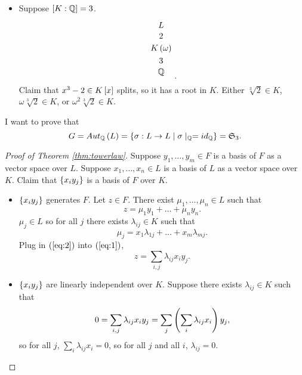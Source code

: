 \begin{example1}
\begin{itemize}
$$$$
Either $ \omega \in K $, that is $ \Q\rb{\omega} \subset K $, so by Theorem \ref{thm:towerlaw} $ \Q\rb{\omega} = K $. Or $ \omega \notin K $ gives $ \sb{K\rb{\omega} : K} = 2 $, so $ \sb{K\rb{\omega} : \Q} = 4 $ contradicts the tower law for $ \Q \subset K\rb{\omega} \subset L $.
\item Suppose $ \sb{K : \Q} = 3 $.
$$
\begin{tikzpicture}
\node (L) at (0, 1) {$ L $};
\node (K) at (0, 0) {$ K\rb{\omega} $};
\node (Q) at (0, -1) {$ \Q $};
\draw (L) -- node[fill=white]{2} (K) -- node[fill=white]{3} (Q);
\end{tikzpicture}.
$$
Claim that $ x^3 - 2 \in K\sb{x} $ splits, so it has a root in $ K $. Either $ \sqrt[3]{2} \in K $, $ \omega\sqrt[3]{2} \in K $, or $ \omega^2\sqrt[3]{2} \in K $.
\end{itemize}
I want to prove that
$$ G = Aut_\Q\rb{L} = \cb{\sigma : L \to L \mid \sigma \mid_\Q = id_\Q} = \mathfrak{S}_3. $$
\end{example1}


\begin{proof}[Proof of Theorem \ref{thm:towerlaw}]
Suppose $ y_1, \dots, y_m \in F $ is a basis of $ F $ as a vector space over $ L $. Suppose $ x_1, \dots, x_n \in L $ is a basis of $ L $ as a vector space over $ K $. Claim that $ \cb{x_iy_j} $ is a basis of $ F $ over $ K $.
\begin{itemize}
\item $ \cb{x_iy_j} $ generates $ F $. Let $ z \in F $. There exist $ \mu_1, \dots, \mu_n \in L $ such that
\begin{equation}
\label{eq:1}
z = \mu_1y_1 + \dots + \mu_ny_n.
\end{equation}
$ \mu_j \in L $ so for all $ j $ there exists $ \lambda_{ij} \in K $ such that
\begin{equation}
\label{eq:2}
\mu_j = x_1\lambda_{1j} + \dots + x_m\lambda_{mj}.
\end{equation}
Plug in $ \rb{\ref{eq:2}} $ into $ \rb{\ref{eq:1}} $,
$$ z = \sum_{i, j} \lambda_{ij}x_iy_j. $$
\item $ \cb{x_iy_j} $ are linearly independent over $ K $. Suppose there exists $ \lambda_{ij} \in K $ such that
$$ 0 = \sum_{i, j} \lambda_{ij}x_iy_j = \sum_j \rb{\sum_i \lambda_{ij}x_i}y_j, $$
so for all $ j $, $ \sum_i \lambda_{ij}x_i = 0 $, so for all $ j $ and all $ i $, $ \lambda_{ij} = 0 $.
\end{itemize}
\end{proof}

